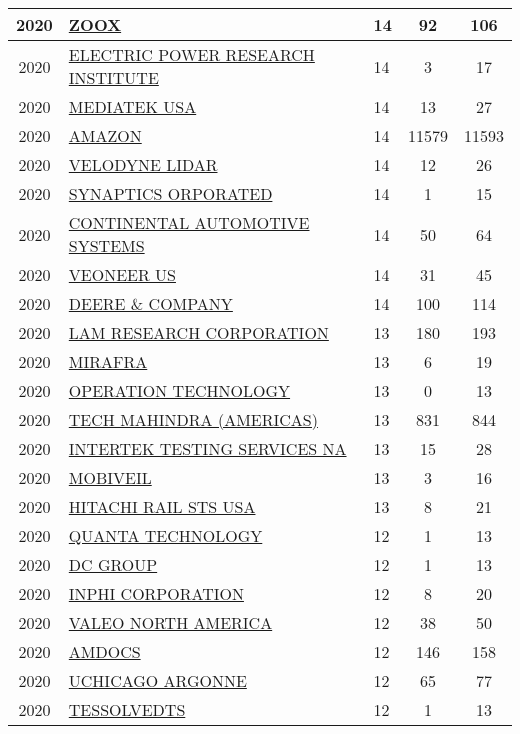 \documentclass{article}%
\begin{document}
\begin{longtable}{c|p{20em}|p{5em}|c|c}
\hline%
2020&\hyperref[subsec:ZOOX]{ZOOX}&14&92&106\\%
\hline%
2020&\hyperref[subsec:ELECTRICPOWERRESEARCHINSTITUTE]{ELECTRIC POWER RESEARCH INSTITUTE}&14&3&17\\%
\hline%
2020&\hyperref[subsec:MEDIATEKUSA]{MEDIATEK USA}&14&13&27\\%
\hline%
2020&\hyperref[subsec:AMAZON]{AMAZON}&14&11579&11593\\%
\hline%
2020&\hyperref[subsec:VELODYNELIDAR]{VELODYNE LIDAR}&14&12&26\\%
\hline%
2020&\hyperref[subsec:SYNAPTICSORPORATED]{SYNAPTICS ORPORATED}&14&1&15\\%
\hline%
2020&\hyperref[subsec:CONTINENTALAUTOMOTIVESYSTEMS]{CONTINENTAL AUTOMOTIVE SYSTEMS}&14&50&64\\%
\hline%
2020&\hyperref[subsec:VEONEERUS]{VEONEER US}&14&31&45\\%
\hline%
2020&\hyperref[subsec:DEERECOMPANY]{DEERE \& COMPANY}&14&100&114\\%
\hline%
2020&\hyperref[subsec:LAMRESEARCHCORPORATION]{LAM RESEARCH CORPORATION}&13&180&193\\%
\hline%
2020&\hyperref[subsec:MIRAFRA]{MIRAFRA}&13&6&19\\%
\hline%
2020&\hyperref[subsec:OPERATIONTECHNOLOGY]{OPERATION TECHNOLOGY}&13&0&13\\%
\hline%
2020&\hyperref[subsec:TECHMAHINDRA(AMERICAS)]{TECH MAHINDRA (AMERICAS)}&13&831&844\\%
\hline%
2020&\hyperref[subsec:INTERTEKTESTINGSERVICESNA]{INTERTEK TESTING SERVICES NA}&13&15&28\\%
\hline%
2020&\hyperref[subsec:MOBIVEIL]{MOBIVEIL}&13&3&16\\%
\hline%
2020&\hyperref[subsec:HITACHIRAILSTSUSA]{HITACHI RAIL STS USA}&13&8&21\\%
\hline%
2020&\hyperref[subsec:QUANTATECHNOLOGY]{QUANTA TECHNOLOGY}&12&1&13\\%
\hline%
2020&\hyperref[subsec:DCGROUP]{DC GROUP}&12&1&13\\%
\hline%
2020&\hyperref[subsec:INPHICORPORATION]{INPHI CORPORATION}&12&8&20\\%
\hline%
2020&\hyperref[subsec:VALEONORTHAMERICA]{VALEO NORTH AMERICA}&12&38&50\\%
\hline%
2020&\hyperref[subsec:AMDOCS]{AMDOCS}&12&146&158\\%
\hline%
2020&\hyperref[subsec:UCHICAGOARGONNE]{UCHICAGO ARGONNE}&12&65&77\\%
\hline%
2020&\hyperref[subsec:TESSOLVEDTS]{TESSOLVEDTS}&12&1&13\\%

\end{longtable}
\end{document}

